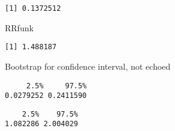 \documentclass[
  letterpaper,
  DIV=11,
  numbers=noendperiod]{scrartcl}
\newenvironment{Shaded}{\begin{snugshade}}{\end{snugshade}}
\newcommand{\NormalTok}[1]{\textcolor[rgb]{0.00,0.23,0.31}{#1}}
\begin{document}
\begin{verbatim}
[1] 0.1372512
\end{verbatim}

\begin{Shaded}
\begin{Highlighting}[]
\NormalTok{RRfunk}
\end{Highlighting}
\end{Shaded}

\begin{verbatim}
[1] 1.488187
\end{verbatim}

Bootstrap for confidence interval, not echoed

\begin{verbatim}
     2.5%     97.5% 
0.0279252 0.2411590 
\end{verbatim}

\begin{verbatim}
    2.5%    97.5% 
1.082286 2.004029 
\end{verbatim}
\end{document}
